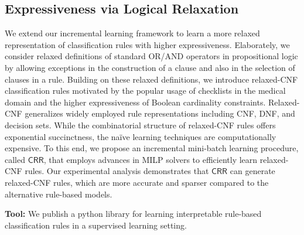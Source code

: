 \subsection{Expressiveness via Logical Relaxation}
We extend our incremental learning framework to learn a more relaxed representation of classification rules with higher expressiveness. Elaborately, we consider relaxed definitions of standard OR/AND operators in propositional logic by allowing exceptions in the construction of a clause and also in the selection of clauses in a rule. Building on these relaxed definitions, we introduce relaxed-CNF classification rules motivated by the popular usage of checklists in the medical domain and the higher expressiveness of Boolean cardinality constraints. Relaxed-CNF generalizes widely employed rule representations including CNF, DNF, and decision sets. While the combinatorial structure of relaxed-CNF rules offers exponential succinctness, the na\"ive learning techniques are computationally expensive. To this end, we propose an incremental mini-batch learning procedure, called $ \mathsf{CRR} $, that employs advances in MILP solvers to efficiently learn relaxed-CNF rules. Our experimental analysis demonstrates that $ \mathsf{CRR} $ can generate relaxed-CNF rules, which are more accurate and sparser compared to the alternative rule-based models.

\textbf{Tool:} We publish a python library \href{https://github.com/meelgroup/MLIC}{{\imli}} for learning interpretable rule-based classification rules in a supervised learning setting.







